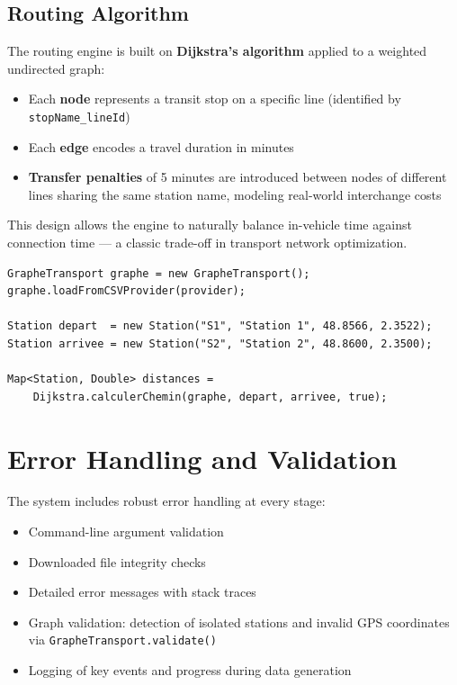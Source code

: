 \documentclass[12pt,a4paper]{article}
\begin{document}
\subsection{Routing Algorithm}

The routing engine is built on \textbf{Dijkstra's algorithm} applied to a weighted undirected graph:

\begin{itemize}
    \item Each \textbf{node} represents a transit stop on a specific line (identified by \texttt{stopName\_lineId})
    \item Each \textbf{edge} encodes a travel duration in minutes
    \item \textbf{Transfer penalties} of 5 minutes are introduced between nodes of different lines sharing the same station name, modeling real-world interchange costs
\end{itemize}

This design allows the engine to naturally balance in-vehicle time against connection time --- a classic trade-off in transport network optimization.

\begin{lstlisting}
GrapheTransport graphe = new GrapheTransport();
graphe.loadFromCSVProvider(provider);

Station depart  = new Station("S1", "Station 1", 48.8566, 2.3522);
Station arrivee = new Station("S2", "Station 2", 48.8600, 2.3500);

Map<Station, Double> distances =
    Dijkstra.calculerChemin(graphe, depart, arrivee, true);
\end{lstlisting}

\section{Error Handling and Validation}

The system includes robust error handling at every stage:

\begin{itemize}
    \item Command-line argument validation
    \item Downloaded file integrity checks
    \item Detailed error messages with stack traces
    \item Graph validation: detection of isolated stations and invalid GPS coordinates via \texttt{GrapheTransport.validate()}
    \item Logging of key events and progress during data generation
\end{itemize}
\end{document}

